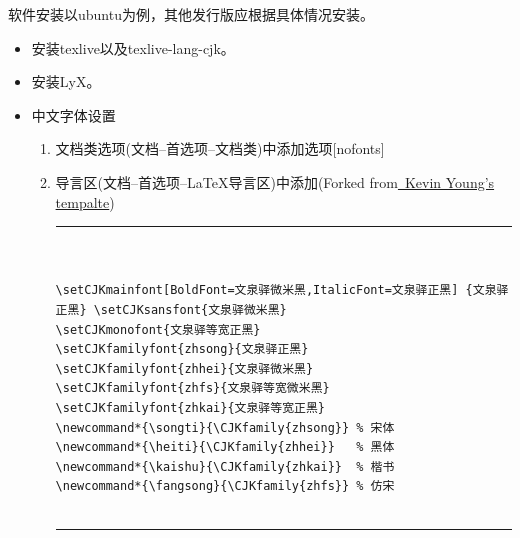 \documentclass[twoside,longtitle]{LZUthesis}
\begin{document}
软件安装以ubuntu为例，其他发行版应根据具体情况安装。
\begin{itemize}
\item 安装texlive以及texlive-lang-cjk。



\item 安装LyX。



\item 中文字体设置

\begin{enumerate}
\item 文档类选项(文档--首选项--文档类)中添加选项{[}nofonts{]}
\item 导言区(文档--首选项--\LaTeX{}导言区)中添加(Forked from\href{https://bitbucket.org/kevinyounglzu/latextemplateoflzuthesis}{~Kevin Young's tempalte})


\tiny
\begin{center}
\hrule


\begin{verbatim}


\setCJKmainfont[BoldFont=文泉驿微米黑,ItalicFont=文泉驿正黑] {文泉驿正黑} \setCJKsansfont{文泉驿微米黑}
\setCJKmonofont{文泉驿等宽正黑}
\setCJKfamilyfont{zhsong}{文泉驿正黑}
\setCJKfamilyfont{zhhei}{文泉驿微米黑}
\setCJKfamilyfont{zhfs}{文泉驿等宽微米黑}
\setCJKfamilyfont{zhkai}{文泉驿等宽正黑}
\newcommand*{\songti}{\CJKfamily{zhsong}} % 宋体
\newcommand*{\heiti}{\CJKfamily{zhhei}}   % 黑体
\newcommand*{\kaishu}{\CJKfamily{zhkai}}  % 楷书
\newcommand*{\fangsong}{\CJKfamily{zhfs}} % 仿宋


\end{verbatim}


\hrule
\end{center}
\normalsize

\end{enumerate}
\end{itemize}
\end{document}

